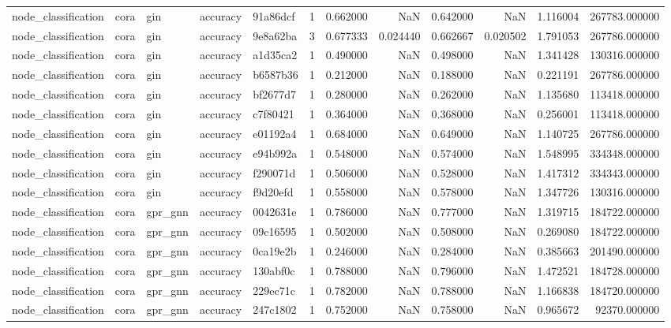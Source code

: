\begin{tabular}{lllllrrrrrrr}
node_classification & cora & gin & accuracy & 91a86dcf & 1 & 0.662000 & NaN & 0.642000 & NaN & 1.116004 & 267783.000000 \\
node_classification & cora & gin & accuracy & 9e8a62ba & 3 & 0.677333 & 0.024440 & 0.662667 & 0.020502 & 1.791053 & 267786.000000 \\
node_classification & cora & gin & accuracy & a1d35ca2 & 1 & 0.490000 & NaN & 0.498000 & NaN & 1.341428 & 130316.000000 \\
node_classification & cora & gin & accuracy & b6587b36 & 1 & 0.212000 & NaN & 0.188000 & NaN & 0.221191 & 267786.000000 \\
node_classification & cora & gin & accuracy & bf2677d7 & 1 & 0.280000 & NaN & 0.262000 & NaN & 1.135680 & 113418.000000 \\
node_classification & cora & gin & accuracy & c7f80421 & 1 & 0.364000 & NaN & 0.368000 & NaN & 0.256001 & 113418.000000 \\
node_classification & cora & gin & accuracy & e01192a4 & 1 & 0.684000 & NaN & 0.649000 & NaN & 1.140725 & 267786.000000 \\
node_classification & cora & gin & accuracy & e94b992a & 1 & 0.548000 & NaN & 0.574000 & NaN & 1.548995 & 334348.000000 \\
node_classification & cora & gin & accuracy & f290071d & 1 & 0.506000 & NaN & 0.528000 & NaN & 1.417312 & 334343.000000 \\
node_classification & cora & gin & accuracy & f9d20efd & 1 & 0.558000 & NaN & 0.578000 & NaN & 1.347726 & 130316.000000 \\
node_classification & cora & gpr_gnn & accuracy & 0042631e & 1 & 0.786000 & NaN & 0.777000 & NaN & 1.319715 & 184722.000000 \\
node_classification & cora & gpr_gnn & accuracy & 09c16595 & 1 & 0.502000 & NaN & 0.508000 & NaN & 0.269080 & 184722.000000 \\
node_classification & cora & gpr_gnn & accuracy & 0ca19e2b & 1 & 0.246000 & NaN & 0.284000 & NaN & 0.385663 & 201490.000000 \\
node_classification & cora & gpr_gnn & accuracy & 130abf0c & 1 & 0.788000 & NaN & 0.796000 & NaN & 1.472521 & 184728.000000 \\
node_classification & cora & gpr_gnn & accuracy & 229ec71c & 1 & 0.782000 & NaN & 0.788000 & NaN & 1.166838 & 184720.000000 \\
node_classification & cora & gpr_gnn & accuracy & 247c1802 & 1 & 0.752000 & NaN & 0.758000 & NaN & 0.965672 & 92370.000000 \\

\end{tabular}

